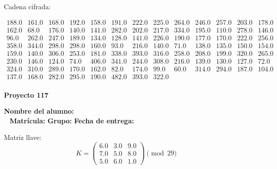 \documentclass[12pt]{article}
\begin{document}
Cadena cifrada:
\begin{center}
$\begin{array}{lllllllllllll}
188.0 & 161.0 & 168.0 & 192.0 & 158.0 & 191.0 & 222.0 & 225.0 & 264.0 & 246.0 & 257.0 & 203.0 & 178.0\\
162.0 & 68.0 & 176.0 & 140.0 & 141.0 & 282.0 & 202.0 & 217.0 & 334.0 & 195.0 & 110.0 & 278.0 & 146.0\\
96.0 & 262.0 & 247.0 & 189.0 & 134.0 & 128.0 & 141.0 & 226.0 & 190.0 & 177.0 & 170.0 & 222.0 & 256.0\\
358.0 & 344.0 & 298.0 & 298.0 & 160.0 & 93.0 & 216.0 & 140.0 & 71.0 & 138.0 & 135.0 & 150.0 & 154.0\\
159.0 & 140.0 & 306.0 & 253.0 & 181.0 & 338.0 & 393.0 & 316.0 & 258.0 & 208.0 & 199.0 & 320.0 & 265.0\\
230.0 & 146.0 & 124.0 & 74.0 & 406.0 & 341.0 & 244.0 & 308.0 & 216.0 & 139.0 & 130.0 & 127.0 & 72.0\\
324.0 & 310.0 & 289.0 & 170.0 & 162.0 & 82.0 & 174.0 & 99.0 & 60.0 & 314.0 & 294.0 & 187.0 & 104.0\\
137.0 & 168.0 & 282.0 & 295.0 & 190.0 & 482.0 & 393.0 & 322.0\\
\end{array}$
\end{center}

\newpage


\textbf{Proyecto 117}

\textbf{Nombre del alumno:} \underline{\hspace{13cm}}\\\
\vspace{1cm}
\textbf{Matrícula:} \underline{\hspace{4cm}} \hspace{1cm}
\textbf{Grupo:} \underline{\hspace{2cm}}
\textbf{Fecha de entrega:} \underline{\hspace{2cm}}

\medskip

Matriz llave:
\[
K = \begin{pmatrix}
6.0 & 3.0 & 9.0\\
7.0 & 5.0 & 8.0\\
5.0 & 6.0 & 1.0
\end{pmatrix} \pmod{29}
\]
\end{document}
